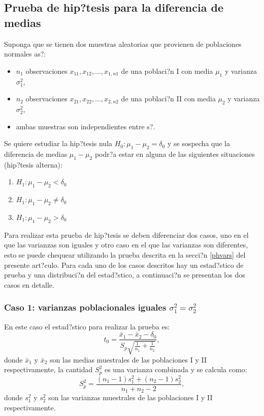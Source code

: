 \documentclass[]{comunicaciones}
\begin{document}
\subsection{Prueba de hip?tesis para la diferencia de medias}
Suponga que se tienen dos muestras aleatorias que provienen de poblaciones normales as?:
\begin{itemize}[noitemsep, nolistsep]
	\item $n_1$ observaciones $x_{11}, x_{12}, \ldots, x_{1,n1}$ de una poblaci?n I con media $\mu_1$ y varianza $\sigma^2_1$,
	\item $n_2$ observaciones $x_{21}, x_{22}, \ldots, x_{2,n2}$ de una poblaci?n II con media $\mu_2$ y varianza $\sigma^2_2$,
	\item ambas muestras son independientes entre s?.
\end{itemize}
Se quiere estudiar la hip?tesis nula $H_0: \mu_1 - \mu_2 = \delta_0$ y se sospecha que la diferencia de medias $\mu_1 - \mu_2$ podr?a estar en alguna de las siguientes situaciones (hip?tesis alterna):
\begin{enumerate}
	\item $H_1: \mu_1 - \mu_2 < \delta_0$
	\item $H_1: \mu_1 - \mu_2 \neq \delta_0$
	\item $H_1: \mu_1 - \mu_2 > \delta_0$
\end{enumerate}
Para realizar esta prueba de hip?tesis se deben diferenciar dos casos, uno en el que las varianzas son iguales y otro caso en el que las varianzas son diferentes, esto se puede chequear utilizando la prueba descrita en la secci?n \ref{phvars} del presente art?culo. Para cada uno de los casos descritos hay un estad?stico de prueba y una distribuci?n del estad?stico, a continuaci?n se presentan los dos casos en detalle.
\subsubsection{Caso 1: varianzas poblacionales iguales $\sigma_1^2 = \sigma_2^2$}
En este caso el estad?stico para realizar la prueba es:
$$t_0=\frac{\bar{x}_1 - \bar{x}_2 - \delta_0}{S_p \sqrt{\frac{1}{n_1} + \frac{1}{n_2}}},$$
donde $\bar{x}_1$ y $\bar{x}_2$ son las medias muestrales de las poblaciones I y II respectivamente, la cantidad $S_p^2$ es una varianza combinada y se calcula como:
$$S_p^2=\frac{(n_1-1)s_1^2+(n_2-1)s_2^2}{n_1+n_2-2},$$
donde $s_1^2$ y $s_2^2$ son las varianzas muestrales de las poblaciones I y II respectivamente.
\end{document}
